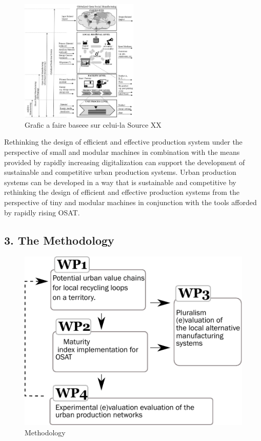 \documentclass[
  11pt,
  a4paperpaper,
  onecolumn]{article}
\begin{document}
\begin{figure}

{\centering \includegraphics[width=0.5\textwidth,height=\textheight]{Figures/Levels.jpeg}

}

\caption{\label{fig-DRAM}Grafic a faire baseee sur celui-la Source XX}

\end{figure}

Rethinking the design of efficient and effective production system under
the perspective of small and modular machines in combination with the
means provided by rapidly increasing digitalization can support the
development of sustainable and competitive urban production systems.
Urban production systems can be developed in a way that is sustainable
and competitive by rethinking the design of efficient and effective
production systems from the perspective of tiny and modular machines in
conjunction with the tools afforded by rapidly rising OSAT.

\hypertarget{the-methodology}{%
\subsection{3. The Methodology}\label{the-methodology}}

\begin{figure}
\centering
    \includegraphics[width=\linewidth]{Figures/WPs.pdf}
    \caption{Methodology}
    \label{fig:WPs}
\end{figure}
\end{document}
